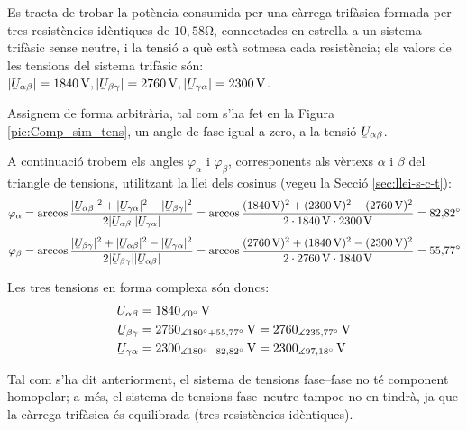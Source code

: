 \begin{exemple}
Es tracta de trobar la pot\`{e}ncia consumida per una c\`{a}rrega trif\`{a}sica
formada per tres resist\`{e}ncies id\`{e}ntiques de $10{,}58\unit{\ohm}$,
connectades en estrella a un sistema trif\`{a}sic sense neutre, i la
tensi\'{o} a qu\`{e} est\`{a} sotmesa cada resist\`{e}ncia; els valors de les
tensions del sistema trif\`{a}sic s\'{o}n: $|\cmplx{U}_{\alpha\beta}| =
1840\unit{V}, |\cmplx{U}_{\beta\gamma}| = 2760\unit{V},
|\cmplx{U}_{\gamma\alpha}| = 2300\unit{V}$.

Assignem de forma arbitr\`{a}ria, tal com s'ha fet en la Figura
\vref{pic:Comp_sim_tens}, un angle de fase igual a zero, a la tensi\'{o}
$\cmplx{U}_{\alpha\beta}$.

A continuaci\'{o} trobem els angles $\varphi_\alpha$ i $\varphi_\beta$,
corresponents als v\`{e}rtexs  $\alpha$ i $\beta$ del triangle de
tensions, utilitzant la llei dels cosinus (vegeu la Secci\'{o}
\vref{sec:llei-s-c-t}): 
\begin{align*}
    \varphi_\alpha &= \arccos \frac{|\cmplx{U}_{\alpha\beta}|^2 + |\cmplx{U}_{\gamma\alpha}|^2 -
    |\cmplx{U}_{\beta\gamma}|^2}{2 |\cmplx{U}_{\alpha\beta}| |\cmplx{U}_{\gamma\alpha}|} =
    \arccos \frac{(1840\unit{V})^2 + (2300\unit{V})^2 - (2760\unit{V})^2}{2 \cdot 1840\unit{V}
    \cdot 2300\unit{V}} = 82{,}82\degree \\[1ex]
    \varphi_\beta &= \arccos \frac{|\cmplx{U}_{\beta\gamma}|^2 + |\cmplx{U}_{\alpha\beta}|^2 -
    |\cmplx{U}_{\gamma\alpha}|^2}{2 |\cmplx{U}_{\beta\gamma}| |\cmplx{U}_{\alpha\beta}|} =
    \arccos \frac{(2760\unit{V})^2 + (1840\unit{V})^2 - (2300\unit{V})^2}{2 \cdot 2760\unit{V}
    \cdot 1840\unit{V}} = 55{,}77\degree
\end{align*}

Les tres tensions en forma complexa s\'{o}n doncs:
\begin{align*}
\cmplx{U}_{\alpha\beta} &= 1840_{\measuredangle 0\degree}\unit{V} \\
\cmplx{U}_{\beta\gamma} &= 2760_{\measuredangle 180\degree +
55{,}77\degree}\unit{V} =
2760_{\measuredangle 235{,}77\degree}\unit{V} \\
\cmplx{U}_{\gamma\alpha} &= 2300_{\measuredangle 180\degree -
82{,}82\degree}\unit{V} = 2300_{\measuredangle 97{,}18\degree}
\unit{V}
\end{align*}

Tal com s'ha dit anteriorment, el sistema de tensions fase--fase no
t\'{e} component homopolar; a m\'{e}s, el sistema de tensions fase--neutre
tampoc no en tindr\`{a}, ja que la c\`{a}rrega trif\`{a}sica \'{e}s equilibrada
(tres resist\`{e}ncies id\`{e}ntiques).


\end{exemple}
